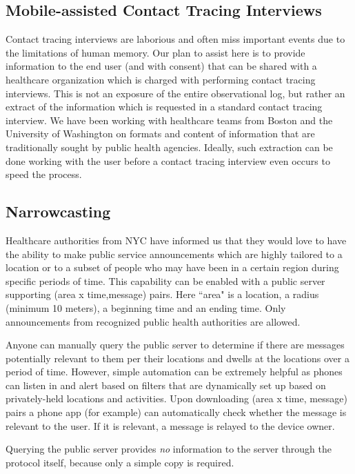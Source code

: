 \documentclass{article}
\begin{document}
\subsection{Mobile-assisted Contact Tracing Interviews} 
Contact tracing interviews are laborious and often miss important events due to the limitations of human memory.  Our plan to assist here is to provide information to the end user (and with consent) that can be shared with a healthcare organization which is charged with performing contact tracing interviews.   This is not an exposure of the entire observational log, but rather an extract of the information which is requested in a standard contact tracing interview. We have been working with healthcare teams from Boston and the University of Washington on formats and content of information that are traditionally sought by public health agencies.  Ideally, such extraction can be done working with the user before a contact tracing interview even occurs to speed the process.

\subsection{Narrowcasting}

Healthcare authorities from NYC have informed us that they would love to have the ability to make public service announcements which are highly tailored to a location or to a subset of people who may have been in a certain region during specific periods of time.  This capability can be enabled with a public server supporting (area x time,message) pairs.  Here ``area" is a location, a radius (minimum 10 meters), a beginning time and an ending time.  Only announcements from recognized public health authorities are allowed.  

Anyone can manually query the public server to determine if there are messages potentially relevant to them per their locations and dwells at the locations over a period of time. However, simple automation can be extremely helpful as phones can listen in and alert based on filters that are dynamically set up based on privately-held locations and activities. Upon downloading (area x time, message) pairs a phone app (for example) can automatically check whether the message is relevant to the user.  If it is relevant, a message is relayed to the device owner.

Querying the public server provides \emph{no} information to the server through the protocol itself, because only a simple copy is required.  
\end{document}
